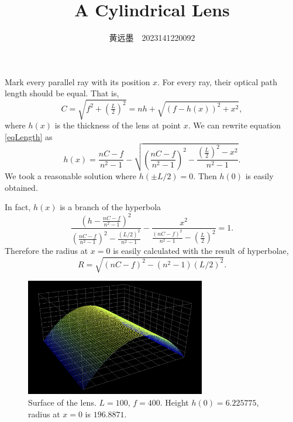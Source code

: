 \documentclass[10pt, twoside]{article}   	%
\title{A Cylindrical Lens}
\author{黄远墨~~2023141220092}
\date{}							%
\theoremstyle{plain}
\theoremstyle{definition}
\begin{document}
	\maketitle
	
	Mark every parallel ray with its position $x$. For every ray, their optical path length should
	be equal. That is,
	\begin{equation}\label{eqLength}
		C = \sqrt{f^2 + \left(\tfrac{L}{2}\right)^2} = nh + \sqrt{(f - h(x))^2 + x^2},
	\end{equation}
	where $h(x)$ is the thickness of the lens at point $x$. We can rewrite equation
	\eqref{eqLength} as
	\begin{equation}
	h(x) = \frac{nC - f}{n^2 - 1} - \sqrt{\left(\frac{nC - f}{n^2 - 1}\right)^2 - \frac{\left(
	\frac{L}{2}\right)^2 - x^2}{n^2 - 1}}.
	\end{equation}
	We took a reasonable solution where $h(\pm L / 2) = 0$. Then $h(0)$ is easily obtained.

	In fact, $h(x)$ is a branch of the hyperbola
	\begin{equation}
		\frac{\left(h - \frac{nC - f}{n^2 - 1}\right)^2}{\left(\frac{nC - f}{n^2 - 1}\right)^2 -
		\frac{(L / 2)^2}{n^2 - 1}} - \frac{x^2}{\frac{(nC - f)^2}{n^2 - 1} - \left( \frac{L}{2}
		\right)^2} = 1.
	\end{equation}
	Therefore the radius at $x = 0$ is easily calculated with the result of hyperbolae,
	\begin{equation}
		R = \sqrt{(nC - f)^2 - (n^2 - 1)(L / 2)^2}.
	\end{equation}

	\begin{figure}[htbp]
		\centering
		\includegraphics[width=0.7\textwidth]{Surface.png}
		\caption{Surface of the lens. $L = 100$, $f = 400$. Height $h(0) = 6.225775$, radius at
		$x = 0$ is $196.8871$.}
	\end{figure}
	
\end{document}
